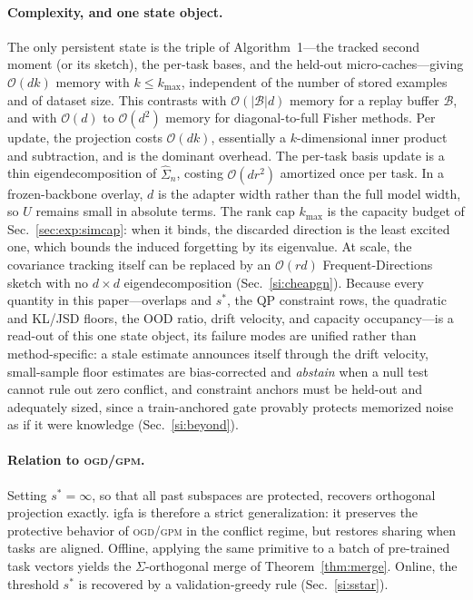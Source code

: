 \documentclass[10pt,a4paper]{article}
\theoremstyle{plain}
\theoremstyle{definition}
\newcommand{\Sig}{\Sigma}
\newcommand{\sstar}{s^{\ast}}
\newcommand{\IGFA}{igfa}
\newcommand{\OGD}{\textsc{ogd}}
\begin{document}
\paragraph{Complexity, and one state object.} The only persistent state is the triple
of Algorithm~1---the tracked second moment (or its sketch), the per-task bases, and the
held-out micro-caches---giving $\mathcal{O}(dk)$ memory with $k\le k_{\max}$,
independent of the number of stored examples and of dataset size. This contrasts with
$\mathcal{O}(|\mathcal B|d)$
memory for a replay buffer $\mathcal B$, and with $\mathcal{O}(d)$ to $\mathcal{O}(d^2)$
memory for diagonal-to-full Fisher methods. Per update, the projection costs
$\mathcal{O}(dk)$, essentially a $k$-dimensional inner product and subtraction, and is
the dominant overhead. The per-task basis update is a thin eigendecomposition of
$\widehat\Sig_n$, costing $\mathcal{O}(dr^2)$ amortized once per task. In a
frozen-backbone overlay, $d$ is the adapter width rather than the full model width, so
$U$ remains small in absolute terms. The rank cap $k_{\max}$ is the capacity budget of
Sec.~\ref{sec:exp:simcap}: when it binds, the discarded direction is the least excited
one, which bounds the induced forgetting by its eigenvalue. At scale, the covariance
tracking itself can be replaced by an $\mathcal{O}(rd)$ Frequent-Directions sketch with
no $d\times d$ eigendecomposition (Sec.~\ref{si:cheapgn}). Because every quantity in
this paper---overlaps and $\sstar$, the QP constraint rows, the quadratic and KL/JSD
floors, the OOD ratio, drift velocity, and capacity occupancy---is a read-out of this
one state object, its failure modes are unified rather than method-specific: a stale
estimate announces itself through the drift velocity, small-sample floor estimates are
bias-corrected and \emph{abstain} when a null test cannot rule out zero conflict, and
constraint anchors must be held-out and adequately sized, since a train-anchored gate
provably protects memorized noise as if it were knowledge (Sec.~\ref{si:beyond}).

\paragraph{Relation to \OGD{}/\textsc{gpm}.} Setting $\sstar=\infty$, so that all past
subspaces are protected, recovers orthogonal projection \cite{farajtabar2020,saha2021}
exactly. \IGFA{} is therefore a strict generalization: it preserves the protective
behavior of \OGD{}/\textsc{gpm} in the conflict regime, but restores sharing when tasks
are aligned. Offline, applying the same primitive to a batch of pre-trained task
vectors yields the $\Sig$-orthogonal merge of Theorem~\ref{thm:merge}. Online, the
threshold $\sstar$ is recovered by a validation-greedy rule (Sec.~\ref{si:sstar}).
\end{document}

